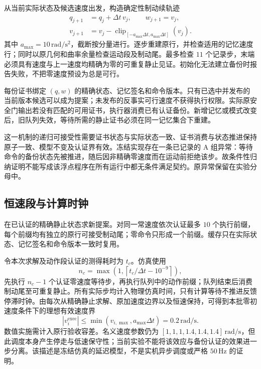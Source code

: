 从当前实际状态及候选速度出发，构造确定性制动续轨迹
\begin{equation}
\begin{aligned}
 q_{j+1}&=q_j+\Delta t\,v_j,\qquad w_{j+1}=v_j,\\
 v_{j+1}&=v_j-\operatorname{clip}_{[-a_{\max}\Delta t,a_{\max}\Delta t]}(v_j).
\end{aligned}\tag{M18}
\end{equation}
其中 $a_{\max}=10\,\mathrm{rad/s^2}$，截断按分量进行。逐步重建原行，并检查适用的记忆速度行；同时以原几何和曲率余量检查运动段及制动尾。最多检查 $11$ 个记录步，末端必须具有速度与上一速度均精确为零的可重复静止见证。初始化无法建立备份时报告失败，不把零速度预设为总是可行。

每份证书绑定 $(q,w)$ 的精确状态、记忆签名和命令版本。只有已选中并发布的当前版本候选可以成为提案；未发布的反事实可行速度不获得执行权限。实际原安全门输出若没有匹配的可用证书，执行器消费已有认证备份。新增记忆或模式改变后，旧队列失效，等待所需的静止证书必须在同一记忆集合下重建。

这一机制的递归可接受性需要证书状态与实际状态一致、证书消费与状态推进保持原子一致、模型不变及认证界有效。冻结实现存在一条已记录的 A 组异常：等待命令的备份状态先被推进，随后因非精确零速度而在运动前拒绝该步。故条件性归纳证明不能写成该浮点程序在所有运行中都无条件满足契约。原异常保留在实验分母中。

\subsection{恒速段与计算时钟}
在已认证的精确静止状态求新提案。对同一常速度依次认证最多 $10$ 个执行前缀，每个前缀均有独立的原行可接受制动尾；零命令只形成一个前缀。缓存只在实际状态、记忆签名和命令版本一致时复用。

令本次求解及动作段认证的测得耗时为 $t_c$。仿真使用
\begin{equation}
 n_c=\max\!\left(1,\left\lceil t_c/\Delta t-10^{-9}\right\rceil\right),\tag{M19}
\end{equation}
先执行 $n_c-1$ 个认证零速度等待步，再执行队列中的动作前缀；队列结束后消费制动尾至可重复静止。所有实际步均计入物理仿真时间，只有计算等待不推进反馈停滞时钟。由每次从精确静止求解、原加速度边界以及恒速保持，可得到本批零初速度条件下的理想有效速度界
\begin{equation}
 |v_i^{\mathrm{exec}}|\le\min(v_{i,\max},a_{\max}\Delta t)=0.2\,\mathrm{rad/s}.\tag{M20}
\end{equation}
数值实施需计入原行验收容差。名义速度参数仍为 $[1,1,1,1.4,1.4,1.4]\,\mathrm{rad/s}$，但此调度本身产生停走与低速保守性；当前实验不能将该效应与备份认证的效果进一步分离。该描述是冻结仿真的延迟模型，不是实机异步调度或严格 $50\,\mathrm{Hz}$ 的证明。

